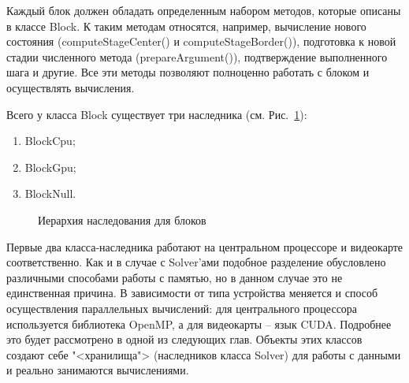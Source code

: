 \documentclass[a4paper, 14pt]{extarticle}
\theoremstyle{definition}
\begin{document}
\par Каждый блок должен обладать определенным набором методов, которые описаны в классе Block. К таким методам относятся, например, вычисление нового состояния (computeStageCenter() и computeStageBorder()), подготовка к новой стадии численного метода (prepareArgument()), подтверждение выполненного шага и другие. Все эти методы позволяют полноценно работать с блоком и осуществлять вычисления.

\par Всего у класса Block существует три наследника (см. Рис.~\ref{ris:blocks}):
\begin{enumerate}
\item[1)] BlockCpu;
\item[2)] BlockGpu;
\item[3)] BlockNull.
\end{enumerate}

\begin{figure}[h]
	\caption{Иерархия наследования для блоков}
	\label{ris:blocks}
\end{figure}

\par Первые два класса-наследника работают на центральном процессоре и видеокарте соответственно. Как и в случае с Solver'ами подобное разделение обусловлено различными способами работы с памятью, но в данном случае это не единственная причина. В зависимости от типа устройства меняется и способ осуществления параллельных вычислений: для центрального процессора используется библиотека OpenMP, а для видеокарты -- язык CUDA. Подробнее это будет рассмотрено в одной из следующих глав. Объекты этих классов создают себе "<хранилища"> (наследников класса Solver) для работы с данными и реально занимаются вычислениями.
\end{document}
